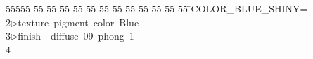 %
%
\begin{tabbing}
55555 \= 55 \= 55 \= 55 \= 55 \= 55 \= 55 \= 55 \= 55 \= 55 \= 55 \= 55 \= 55 \= \>COLOR\_BLUE\_SHINY=\\[0pt]
2\>$\triangleright$\>texture\ pigment\ color\ Blue\ \ \\[0pt]
3\>$\triangleright$\>finish\ \ diffuse\ 09\ phong\ 1\\[0pt]
4\>\end{tabbing}
